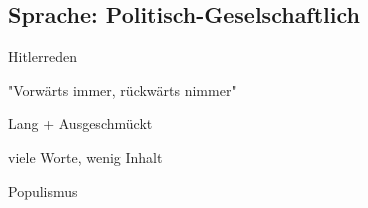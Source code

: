 \subsection{Sprache: Politisch-Geselschaftlich}

\startitemize[packed]
\item Hitlerreden
\item "Vorwärts immer, rückwärts nimmer"
\item Lang + Ausgeschmückt
\item viele Worte, wenig Inhalt
\item Populismus
\stopitemize
